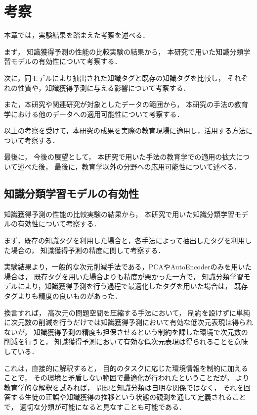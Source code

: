 \chapter{考察}
\label{chap:discussion}
\fancyhf{}
\rhead{\thepage}
\cfoot{\thepage}

本章では，実験結果を踏まえた考察を述べる．

まず，
知識獲得予測の性能の比較実験の結果から，
本研究で用いた知識分類学習モデルの有効性について考察する．

次に，同モデルにより抽出された知識タグと既存の知識タグを比較し，
それぞれの性質や，知識獲得予測に与える影響について考察する．

また，本研究や関連研究が対象としたデータの範囲から，
本研究の手法の教育学における他のデータへの適用可能性について考察する．

以上の考察を受けて，本研究の成果を実際の教育現場に適用し，活用する方法について考察する．

最後に，
今後の展望として，
本研究で用いた手法の教育学での適用の拡大について述べた後，
最後に，教育学以外の分野への応用可能性について述べる．


\section{知識分類学習モデルの有効性}
知識獲得予測の性能の比較実験の結果から，
本研究で用いた知識分類学習モデルの有効性について考察する．


まず，既存の知識タグを利用した場合と，各手法によって抽出したタグを利用した場合の，
知識獲得予測の精度に関して考察する．

実験結果より，一般的な次元削減手法である，PCAやAutoEncoderのみを用いた場合は，
既存タグを用いた場合よりも精度が悪かった一方で，
知識分類学習モデルにより，知識獲得予測を行う過程で最適化したタグを用いた場合は，
既存タグよりも精度の良いものがあった．

換言すれば，
高次元の問題空間を圧縮する手法において，
制約を設けずに単純に次元数の削減を行うだけでは知識獲得予測において有効な低次元表現は得られないが，
知識獲得予測の精度も担保させるという制約を課した環境で次元数の削減を行うと，
知識獲得予測において有効な低次元表現は得られることを意味している．

これは，直接的に解釈すると，
目的のタスクに応じた環境情報を制約に加えることで，
その環境と矛盾しない範囲で最適化が行われたということだが，
より教育学的な解釈を試みれば，
問題と知識分類は自明な関係ではなく，
それを回答する生徒の正誤や知識獲得の推移という状態の観測を通して定義されることで，
適切な分類が可能になると見なすことも可能である．


